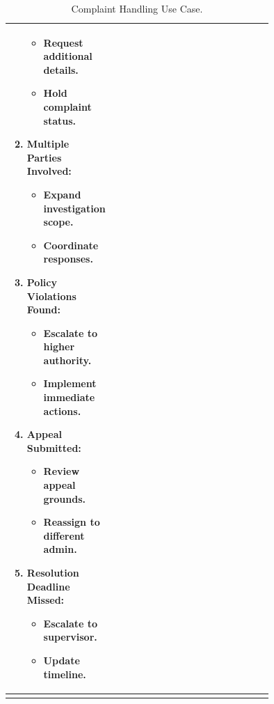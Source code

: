 \begin{center}
\begin{longtable}{|l|p{0.75\linewidth}|}
\begin{enumerate}
\begin{itemize}
                \item Request additional details.
                \item Hold complaint status.
            \end{itemize} 
            \item \textbf{Multiple Parties Involved:} 
            \begin{itemize}
                \item Expand investigation scope.
                \item Coordinate responses.
            \end{itemize} 
            \item \textbf{Policy Violations Found:}
            \begin{itemize}
                \item Escalate to higher authority.
                \item Implement immediate actions.
            \end{itemize} 
            \item \textbf{Appeal Submitted:} 
            \begin{itemize}
                \item Review appeal grounds.
                \item Reassign to different admin.
            \end{itemize} 
            \item \textbf{Resolution Deadline Missed:} 
            \begin{itemize}
                \item Escalate to supervisor.
                \item  Update timeline.
            \end{itemize}
        \end{enumerate} \\
        \hline
        \caption{Complaint Handling Use Case.}
        \label{tab:complaint_handling_use_case}
    \end{longtable}
\end{center}


